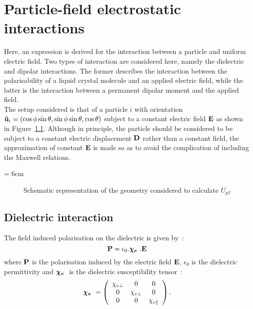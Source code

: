 

\chapter{Particle-field electrostatic interactions}
\label{chap:B}

Here, an expression is derived for the interaction between a particle and uniform electric field.
Two types of interaction are considered here, namely the dielectric and dipolar interactions.
The former describes the interaction between the polarisability of a liquid crystal molecule 
and an applied electric
field, while the latter is the interaction between a permanent dipolar moment and the
applied field.\\

The setup considered is that of a particle $i$ with orientation 
$\mathbf{\hat{u} }_i = (\cos\phi\sin\theta, \- \sin\phi\sin\theta, \cos\theta)$ subject to a constant
electric field $\mathbf{E}$ as shown in Figure~\ref{fig:partFieldSetup}. Although in principle, the
particle should be considered to be subject to a constant electric displacement $\mathbf{D}$ 
rather than a constant field, the approximation of constant $\mathbf{E}$ is made so as to avoid
the complication of including the Maxwell relations.


\picW = 6cm
\begin{figure}
	\centering
	\caption{Schematic representation of the geometry considered to calculate $U_{pf}$}
	\label{fig:partFieldSetup}
\end{figure}



\section{Dielectric interaction}

The field induced polarisation on the dielectric is given by~:
\begin{equation}
	\mathbf{P} = \epsilon_0.\mbox{\boldmath $\chi_e$ }.\mathbf{E}
\end{equation}
%
where $\mathbf{P}$ is the polarisation induced by the electric field $\mathbf{E}$,
$\epsilon_0$ is the dielectric permittivity and $\mbox{\boldmath $\chi_e$ }$ is the 
dielectric susceptibility tensor~:
%
\begin{equation}
	\mbox{\boldmath $\chi_e$ } = \left(
	\begin{array}{ccc}
		\chi_{e\perp}	&0			&0	\\
		0			&\chi_{e\perp}	&0	\\
		0			&0			&\chi_{e\parallel}
	\end{array}
	\right).
\end{equation}

